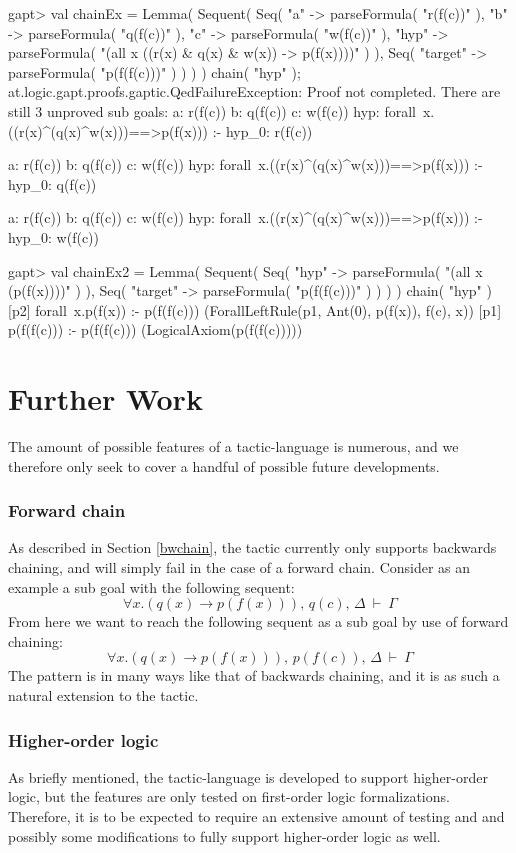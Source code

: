 \documentclass{article}
\newcommand{\cli}[1]{{\ttfamily {#1}}}
\def\fCenter{\ \vdash\ }
\begin{document}
\begin{clilisting}
gapt> val chainEx = Lemma( Sequent( Seq( "a" -> parseFormula( "r(f(c))" ), "b" -> parseFormula( "q(f(c))" ), "c" -> parseFormula( "w(f(c))" ), "hyp" -> parseFormula( "(all x ((r(x) & q(x) & w(x)) -> p(f(x))))" ) ), Seq( "target" -> parseFormula( "p(f(f(c)))" ) ) ) ) { chain( "hyp" ); }
at.logic.gapt.proofs.gaptic.QedFailureException: Proof not completed. There are still 3 unproved sub goals:
a: r(f(c))
b: q(f(c))
c: w(f(c))
hyp: forall~x.((r(x)^(q(x)^w(x)))==>p(f(x)))
:-
hyp_0: r(f(c))

a: r(f(c))
b: q(f(c))
c: w(f(c))
hyp: forall~x.((r(x)^(q(x)^w(x)))==>p(f(x)))
:-
hyp_0: q(f(c))

a: r(f(c))
b: q(f(c))
c: w(f(c))
hyp: forall~x.((r(x)^(q(x)^w(x)))==>p(f(x)))
:-
hyp_0: w(f(c))

gapt> val chainEx2 = Lemma( Sequent( Seq( "hyp" -> parseFormula( "(all x (p(f(x))))" ) ), Seq( "target" -> parseFormula( "p(f(f(c)))" ) ) ) ) { chain( "hyp" ) }
[p2] forall~x.p(f(x)) :- p(f(f(c)))    (ForallLeftRule(p1, Ant(0), p(f(x)), f(c), x))
[p1] p(f(f(c))) :- p(f(f(c)))    (LogicalAxiom(p(f(f(c)))))
\end{clilisting}

\section{Further Work}

The amount of possible features of a tactic-language is numerous, and we therefore only seek to cover a handful of possible future developments.

\subsubsection*{Forward chain}
As described in Section \ref{bwchain}, the \cli{chain} tactic currently only supports backwards chaining, and will simply fail in the case of a forward chain. Consider as an example a sub goal with the following sequent:
$$
\forall x . ( q(x) \to p(f(x)) ),\, q(c),\, \Delta \fCenter \Gamma
$$
From here we want to reach the following sequent as a sub goal by use of forward chaining:
$$
\forall x . ( q(x) \to p(f(x)) ),\, p(f(c)),\, \Delta \fCenter \Gamma
$$
The pattern is in many ways like that of backwards chaining, and it is as such a natural extension to the \cli{chain} tactic.

\subsubsection*{Higher-order logic}
As briefly mentioned, the tactic-language is developed to support higher-order logic, but the features are only tested on first-order logic formalizations. Therefore, it is to be expected to require an extensive amount of testing and and possibly some modifications to fully support higher-order logic as well.
\end{document}
